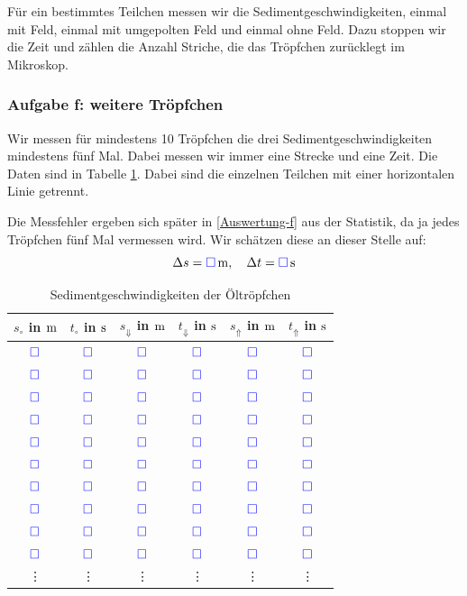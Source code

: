 \documentclass[11pt, ngerman]{article}
\newcommand{\messwert}{\textcolor{blue}{\square}}
\begin{document}
Für ein bestimmtes Teilchen messen wir die Sedimentgeschwindigkeiten, einmal
mit Feld, einmal mit umgepolten Feld und einmal ohne Feld. Dazu stoppen wir die
Zeit und zählen die Anzahl Striche, die das Tröpfchen zurücklegt im Mikroskop.

\subsubsection{Aufgabe f: weitere Tröpfchen}

Wir messen für mindestens 10 Tröpfchen die drei Sedimentgeschwindigkeiten
mindestens fünf Mal. Dabei messen wir immer eine Strecke und eine Zeit. Die
Daten sind in Tabelle \ref{table:sediment1}. Dabei sind die einzelnen Teilchen
mit einer horizontalen Linie getrennt.

Die Messfehler ergeben sich später in \ref{Auswertung-f} aus der Statistik, da
ja jedes Tröpfchen fünf Mal vermessen wird. Wir schätzen diese an dieser Stelle
auf:
\[
	\Delta s = \unit[\messwert] m
	, \quad
	\Delta t = \unit[\messwert] s
\]

\begin{table}[h!]
	\centering

	\begin{tabular}{cccccc}
		$s_\circ$ in $\unit m$ & $t_\circ$ in $\unit s$ & $s_\Downarrow$ in $\unit m$ & $t_\Downarrow$ in $\unit s$ & $s_\Uparrow$ in $\unit m$ & $t_\Uparrow$ in $\unit s$ \\
		\hline \hline
		$\messwert$ & $\messwert$ & $\messwert$ & $\messwert$ & $\messwert$ & $\messwert$\\
		$\messwert$ & $\messwert$ & $\messwert$ & $\messwert$ & $\messwert$ & $\messwert$\\
		$\messwert$ & $\messwert$ & $\messwert$ & $\messwert$ & $\messwert$ & $\messwert$\\
		$\messwert$ & $\messwert$ & $\messwert$ & $\messwert$ & $\messwert$ & $\messwert$\\
		$\messwert$ & $\messwert$ & $\messwert$ & $\messwert$ & $\messwert$ & $\messwert$\\
		\hline
		$\messwert$ & $\messwert$ & $\messwert$ & $\messwert$ & $\messwert$ & $\messwert$\\
		$\messwert$ & $\messwert$ & $\messwert$ & $\messwert$ & $\messwert$ & $\messwert$\\
		$\messwert$ & $\messwert$ & $\messwert$ & $\messwert$ & $\messwert$ & $\messwert$\\
		$\messwert$ & $\messwert$ & $\messwert$ & $\messwert$ & $\messwert$ & $\messwert$\\
		$\messwert$ & $\messwert$ & $\messwert$ & $\messwert$ & $\messwert$ & $\messwert$\\
		\hline
				\vdots & \vdots & \vdots & \vdots & \vdots & \vdots
	\end{tabular}

	\caption{Sedimentgeschwindigkeiten der Öltröpfchen}
	\label{table:sediment1}
\end{table}
\end{document}
